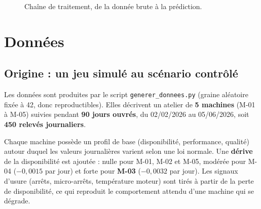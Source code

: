 \documentclass[11pt,a4paper]{article}
\newcommand{\code}[1]{\texttt{#1}}
\begin{document}
\begin{figure}[ht]
\centering
{}
\caption{Chaîne de traitement, de la donnée brute à la prédiction.}
\label{fig:pipeline}
\end{figure}

\section{Données}

\subsection{Origine : un jeu simulé au scénario contrôlé}
Les données sont produites par le script \code{generer\_donnees.py} (graine aléatoire fixée à
42, donc reproductibles). Elles décrivent un atelier de \textbf{5 machines} (M-01 à M-05) suivies
pendant \textbf{90 jours ouvrés}, du 02/02/2026 au 05/06/2026, soit \textbf{450 relevés journaliers}.

Chaque machine possède un profil de base (disponibilité, performance, qualité) autour duquel les
valeurs journalières varient selon une loi normale. Une \textbf{dérive} de la disponibilité est
ajoutée : nulle pour M-01, M-02 et M-05, modérée pour M-04 ($-0{,}0015$ par jour) et forte pour
\textbf{M-03} ($-0{,}0032$ par jour). Les signaux d'usure (arrêts, micro-arrêts, température
moteur) sont tirés à partir de la perte de disponibilité, ce qui reproduit le comportement
attendu d'une machine qui se dégrade.
\end{document}
